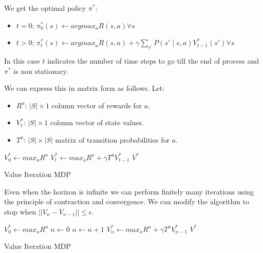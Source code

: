 \documentclass[12pt]{article}
\begin{document}
            We get the optimal policy $\pi^*$:
            \begin{itemize}
                \item $t=0$; $\pi_0^*(s) \gets argmax_a R(s,a) \forall s$
                \item $t>0$; $\pi_t^*(s) \gets argmax_a R(s,a) + \gamma \sum_{s'}P(s' \mid s, a) V_{t-1}^* (s') \forall s$
            \end{itemize}
            
            In this case $t$ indicates the number of time steps to go till the end of process and $\pi^*$ is non
            stationary. 
            
            We can express this in matrix form as follows. Let:
            \begin{itemize}
                \item $R^a$: $|S| \times 1$ column vector of rewards for $a$.
                \item $V_t^*$: $|S| \times 1$ column vector of state values.
                \item $T^a$: $|S| \times |S|$ matrix of transition probabilities for $a$.
            \end{itemize}

            \begin{algorithm}[H]
                \SetAlgoLined
                $V_0^* \gets max_a R^a$\;
                 {
                    $V_t^* \gets max_a R^a + \gamma T^a V_{t-1}^*$
                }
                \Return $V^*$
                \caption{Value Iteration MDP}
            \end{algorithm}

            Even when the horizon is infinite we can perform finitely many iterations using the principle of
            contraction and convergence. We can modify the algorithm to stop when $||V_n - V_{n-1}|| \leq \epsilon$.
            
            \begin{algorithm}[H] \label{InfiniteValIterAlgo}
                \SetAlgoLined
                $V_0^* \gets max_a R^a$\;
                $n \gets 0$\;
                 {$n \gets n + 1$\;
                $V_n^* \gets max_a R^a + \gamma T^a V_{n-1}^*$\;}
                \Return $V^*$
                \caption{Value Iteration MDP}
            \end{algorithm}
\end{document}
